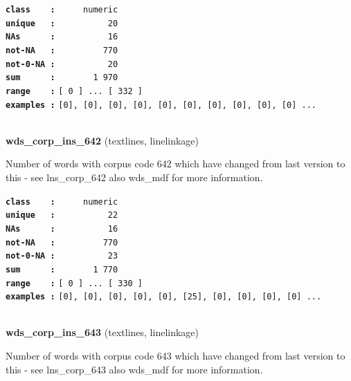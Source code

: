 \documentclass[]{article}
\begin{document}
\textbf{\texttt{class\ \ \ \ :}} \texttt{~~~~~numeric}\\
\textbf{\texttt{unique\ \ \ :}} \texttt{~~~~~~~~~~20}\\
\textbf{\texttt{NAs\ \ \ \ \ \ :}} \texttt{~~~~~~~~~~16}\\
\textbf{\texttt{not-NA\ \ \ :}} \texttt{~~~~~~~~~770}\\
\textbf{\texttt{not-0-NA\ :}} \texttt{~~~~~~~~~~20}\\
\textbf{\texttt{sum\ \ \ \ \ \ :}} \texttt{~~~~~~~1~970}\\
\textbf{\texttt{range\ \ \ \ :}}
\texttt{{[}\ 0\ {]}\ ...\ {[}\ 332\ {]}}\\
\textbf{\texttt{examples\ :}}
\texttt{{[}0{]},\ {[}0{]},\ {[}0{]},\ {[}0{]},\ {[}0{]},\ {[}0{]},\ {[}0{]},\ {[}0{]},\ {[}0{]},\ {[}0{]}\ ...}\\

~

\textbf{wds\_corp\_ins\_642} (textlines, linelinkage)

Number of words with corpus code 642 which have changed from last
version to this - see lns\_corp\_642 also wds\_mdf for more information.

\textbf{\texttt{class\ \ \ \ :}} \texttt{~~~~~numeric}\\
\textbf{\texttt{unique\ \ \ :}} \texttt{~~~~~~~~~~22}\\
\textbf{\texttt{NAs\ \ \ \ \ \ :}} \texttt{~~~~~~~~~~16}\\
\textbf{\texttt{not-NA\ \ \ :}} \texttt{~~~~~~~~~770}\\
\textbf{\texttt{not-0-NA\ :}} \texttt{~~~~~~~~~~23}\\
\textbf{\texttt{sum\ \ \ \ \ \ :}} \texttt{~~~~~~~1~770}\\
\textbf{\texttt{range\ \ \ \ :}}
\texttt{{[}\ 0\ {]}\ ...\ {[}\ 330\ {]}}\\
\textbf{\texttt{examples\ :}}
\texttt{{[}0{]},\ {[}0{]},\ {[}0{]},\ {[}0{]},\ {[}0{]},\ {[}25{]},\ {[}0{]},\ {[}0{]},\ {[}0{]},\ {[}0{]}\ ...}\\

~

\textbf{wds\_corp\_ins\_643} (textlines, linelinkage)

Number of words with corpus code 643 which have changed from last
version to this - see lns\_corp\_643 also wds\_mdf for more information.
\end{document}
